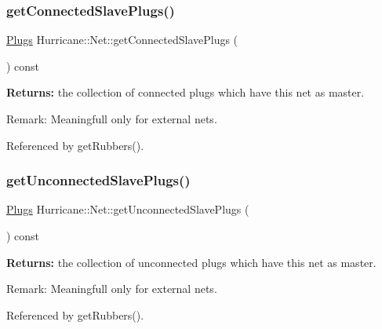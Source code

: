 \subsubsection{\texorpdfstring{get\+Connected\+Slave\+Plugs()}{getConnectedSlavePlugs()}}
{\footnotesize\ttfamily \hyperlink{namespaceHurricane_ac8335d2057483ee7a935c15a9460c64f}{Plugs} Hurricane\+::\+Net\+::get\+Connected\+Slave\+Plugs (\begin{DoxyParamCaption}{ }\end{DoxyParamCaption}) const}

{\bfseries Returns\+:} the collection of connected plugs which have this net as master.

\begin{DoxyParagraph}{Remark\+:}
Meaningfull only for external nets. 
\end{DoxyParagraph}


Referenced by get\+Rubbers().

\mbox{\label{classHurricane_1_1Net_aad3f3ea88bdea914cab3f38bdcdb843d}} 
\subsubsection{\texorpdfstring{get\+Unconnected\+Slave\+Plugs()}{getUnconnectedSlavePlugs()}}
{\footnotesize\ttfamily \hyperlink{namespaceHurricane_ac8335d2057483ee7a935c15a9460c64f}{Plugs} Hurricane\+::\+Net\+::get\+Unconnected\+Slave\+Plugs (\begin{DoxyParamCaption}{ }\end{DoxyParamCaption}) const}

{\bfseries Returns\+:} the collection of unconnected plugs which have this net as master.

\begin{DoxyParagraph}{Remark\+:}
Meaningfull only for external nets. 
\end{DoxyParagraph}


Referenced by get\+Rubbers().

\mbox{\label{classHurricane_1_1Net_a1730ed1247cd9bce7fcf519ea60dc738}} 
